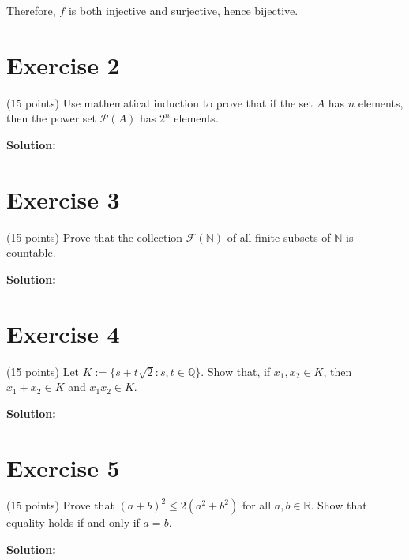 \documentclass{article}
\begin{document}
Therefore, $f$ is both injective and surjective, hence bijective.

\newpage

\section*{Exercise 2}
(15 points) Use mathematical induction to prove that if the set $A$ has $n$ elements, then the power set $\mathcal{P}(A)$ has $2^n$ elements.

\textbf{Solution:}

\newpage

\section*{Exercise 3}
(15 points) Prove that the collection $\mathcal{F}(\mathbb{N})$ of all finite subsets of $\mathbb{N}$ is countable.

\textbf{Solution:}

\newpage

\section*{Exercise 4}
(15 points) Let $K := \{s + t\sqrt{2} : s,t \in \mathbb{Q}\}$. Show that, if $x_1, x_2 \in K$, then $x_1 + x_2 \in K$ and $x_1x_2 \in K$.

\textbf{Solution:}

\newpage

\section*{Exercise 5}
(15 points) Prove that $(a + b)^2 \leq 2(a^2 + b^2)$ for all $a,b \in \mathbb{R}$. Show that equality holds if and only if $a = b$.

\textbf{Solution:}
\end{document}

